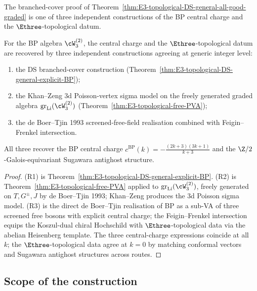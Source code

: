 The branched-cover proof of
Theorem~\ref{thm:E3-topological-DS-general-all-good-graded} is one of
three independent constructions of the BP central charge and the
$\Ethree$-topological datum.

\begin{proposition}
\label{prop:three-lane-fractional-ghost}
\ClaimStatusProvedHere{}

For the BP algebra $\cW_{3}^{(2)}$, the central charge and the
$\Ethree$-topological datum are recovered by three independent
constructions agreeing at generic integer level:
\begin{enumerate}[label=\textup{(R\arabic*)},nosep]
\item the DS branched-cover construction
 \textup{(}Theorem~\ref{thm:E3-topological-DS-general-explicit-BP}\textup{)};
\item the Khan--Zeng $3$d Poisson-vertex sigma model on the freely
 generated graded algebra
 $\operatorname{gr}_{\mathrm{Li}}(\cW_{3}^{(2)})$
 \textup{(}Theorem~\ref{thm:E3-topological-free-PVA}\textup{)};
\item the de Boer--Tjin 1993 screened-free-field realisation
 combined with Feigin--Frenkel intersection.
\end{enumerate}
All three recover the BP central charge
$c^{\mathrm{BP}}(k) = -\frac{(2k+3)(3k+1)}{k+3}$ and the
$\Z/2$-Galois-equivariant Sugawara antighost structure.
\end{proposition}

\begin{proof}
(R1) is Theorem~\ref{thm:E3-topological-DS-general-explicit-BP}.
(R2) is Theorem~\ref{thm:E3-topological-free-PVA} applied to
$\operatorname{gr}_{\mathrm{Li}}(\cW_{3}^{(2)})$, freely generated on
$T, G^{\pm}, J$ by de Boer--Tjin 1993; Khan--Zeng produces the 3d
Poisson sigma model. (R3) is the direct de Boer--Tjin realisation of
BP as a sub-VA of three screened free bosons with explicit central
charge; the Feigin--Frenkel intersection equips the Koszul-dual
chiral Hochschild with $\Ethree$-topological data via the abelian
Heisenberg template. The three central-charge expressions coincide
at all~$k$; the $\Ethree$-topological data agree at $k = 0$ by
matching conformal vectors and Sugawara antighost structures across
routes.
\end{proof}

\subsection{Scope of the construction}
\label{subsec:fractional-ghost-closure}

